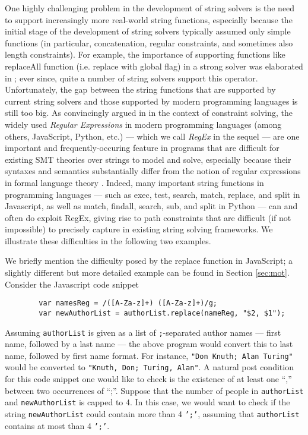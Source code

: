 One highly challenging problem in the development of string solvers is the need
to support increasingly more real-world string functions, especially because the
initial stage of the development of string solvers typically assumed only simple
functions (in particular, concatenation, regular constraints, and sometimes also
length constraints). For example, the importance of supporting functions like
replaceAll function (i.e. replace with global flag) in a strong solver was 
elaborated in \cite{??};
ever since, quite a number of string solvers support this operator.
Unfortunately, the gap between the string functions that are supported by 
current string solvers and those supported by modern programming languages 
is still too big. As convincingly argued in \cite{LMK19} in the context of 
constraint solving, 
the widely used \emph{Regular Expressions} in modern programming
languages
(among others, JavaScript, Python, etc.) --- which we call \emph{RegEx} 
in the sequel --- are one important and frequently-occuring feature in
programs that are difficult for existing SMT theories over 
strings to model and solve, especially because their syntaxes and semantics 
substantially differ from the notion of regular expressions in formal 
language theory \cite{HU79}. Indeed,
many important string functions in programming languages --- such as exec, test,
search, match, replace, and split in Javascript, as well as match, findall,
search, sub, and split in Python --- can and often do exploit RegEx, giving 
rise to path constraints that are difficult (if not impossible) to precisely 
capture in existing string solving frameworks. We illustrate these difficulties
in the following two examples.
\begin{example}\label{exmp-name-swap}
    We briefly mention the difficulty posed by the replace
    function in JavaScript; a slightly different but more detailed example can be found
    in Section \ref{sec:mot}. Consider the Javascript code snippet
    \begin{verbatim}
        var namesReg = /([A-Za-z]+) ([A-Za-z]+)/g;
        var newAuthorList = authorList.replace(nameReg, "$2, $1");
    \end{verbatim}
    Assuming \texttt{authorList} is given as a 
    list of \texttt{;}-separated author names --- first name, followed by a last name ---
    the above program would convert this to last name, followed by first name
    format. For instance, \texttt{"Don Knuth; Alan Turing"} would
    be converted to \texttt{"Knuth, Don; Turing, Alan"}.
    A natural post condition for this code snippet one would like to check is the existence of at least one ``,'' between two occurrences of ``;''.
\OMIT
{   
    Suppose that the number of people in \texttt{authorList} and 
   \texttt{newAuthorList} is capped to 4. In this case, we would want to
   check if the string \texttt{newAuthorList} could contain
   more than 4 \texttt{';'}, assuming that \texttt{authorList} contains at most
   than 4 \texttt{';'}.
}
\end{example}

